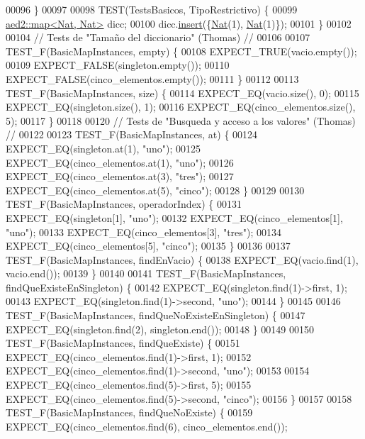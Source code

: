 \begin{DoxyCode}
00096 \}
00097 
00098 TEST(TestsBasicos, TipoRestrictivo) \{
00099     \hyperlink{classaed2_1_1map}{aed2::map<Nat, Nat>} dicc;
00100     dicc.\hyperlink{classaed2_1_1map_a6941cde9a79c27f054b5c97a587a1854_a6941cde9a79c27f054b5c97a587a1854}{insert}(\{\hyperlink{classNat}{Nat}(1), \hyperlink{classNat}{Nat}(1)\});
00101 \}
00102 
00104 \textcolor{comment}{// Tests de "Tamaño del diccionario" (Thomas) //}
00106 \textcolor{comment}{}
00107 TEST\_F(BasicMapInstances, empty) \{
00108     EXPECT\_TRUE(vacio.empty());
00109     EXPECT\_FALSE(singleton.empty());
00110     EXPECT\_FALSE(cinco\_elementos.empty());
00111 \}
00112 
00113 TEST\_F(BasicMapInstances, size) \{
00114     EXPECT\_EQ(vacio.size(), 0);
00115     EXPECT\_EQ(singleton.size(), 1);
00116     EXPECT\_EQ(cinco\_elementos.size(), 5);
00117 \}
00118 
00120 \textcolor{comment}{// Tests de "Busqueda y acceso a los valores" (Thomas) //}
00122 \textcolor{comment}{}
00123 TEST\_F(BasicMapInstances, at) \{
00124     EXPECT\_EQ(singleton.at(1), \textcolor{stringliteral}{"uno"});
00125     EXPECT\_EQ(cinco\_elementos.at(1), \textcolor{stringliteral}{"uno"});
00126     EXPECT\_EQ(cinco\_elementos.at(3), \textcolor{stringliteral}{"tres"});
00127     EXPECT\_EQ(cinco\_elementos.at(5), \textcolor{stringliteral}{"cinco"});
00128 \}
00129 
00130 TEST\_F(BasicMapInstances, operadorIndex) \{
00131     EXPECT\_EQ(singleton[1], \textcolor{stringliteral}{"uno"});
00132     EXPECT\_EQ(cinco\_elementos[1], \textcolor{stringliteral}{"uno"});
00133     EXPECT\_EQ(cinco\_elementos[3], \textcolor{stringliteral}{"tres"});
00134     EXPECT\_EQ(cinco\_elementos[5], \textcolor{stringliteral}{"cinco"});
00135 \}
00136 
00137 TEST\_F(BasicMapInstances, findEnVacio) \{
00138     EXPECT\_EQ(vacio.find(1), vacio.end());
00139 \}
00140 
00141 TEST\_F(BasicMapInstances, findQueExisteEnSingleton) \{
00142     EXPECT\_EQ(singleton.find(1)->first, 1);
00143     EXPECT\_EQ(singleton.find(1)->second, \textcolor{stringliteral}{"uno"});
00144 \}
00145 
00146 TEST\_F(BasicMapInstances, findQueNoExisteEnSingleton) \{
00147     EXPECT\_EQ(singleton.find(2), singleton.end());
00148 \}
00149 
00150 TEST\_F(BasicMapInstances, findQueExiste) \{
00151     EXPECT\_EQ(cinco\_elementos.find(1)->first, 1);
00152     EXPECT\_EQ(cinco\_elementos.find(1)->second, \textcolor{stringliteral}{"uno"});
00153 
00154     EXPECT\_EQ(cinco\_elementos.find(5)->first, 5);
00155     EXPECT\_EQ(cinco\_elementos.find(5)->second, \textcolor{stringliteral}{"cinco"});
00156 \}
00157 
00158 TEST\_F(BasicMapInstances, findQueNoExiste) \{
00159     EXPECT\_EQ(cinco\_elementos.find(6), cinco\_elementos.end());

\end{DoxyCode}
